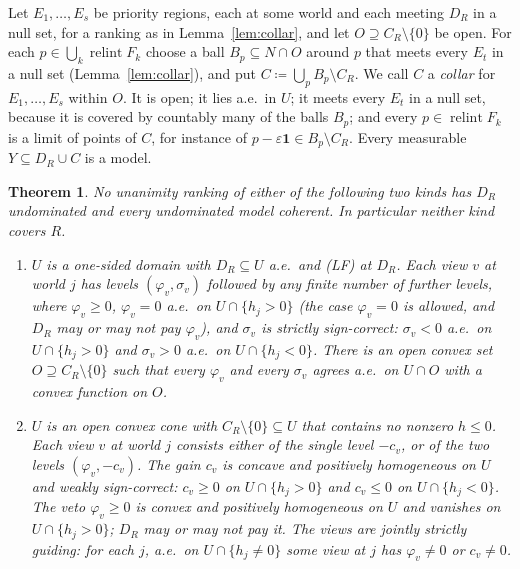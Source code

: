 \documentclass[11pt]{article}
\newcommand{\one}{\mathbf{1}}
\DeclareMathOperator{\relint}{relint}
\theoremstyle{plain}
\newtheorem{theorem}{Theorem}[section]
\theoremstyle{definition}
\theoremstyle{remark}
\begin{document}
Let $E_1,\dots,E_s$ be priority regions, each at some world and each meeting $D_R$ in a
null set, for a ranking as in Lemma~\ref{lem:collar}, and let $O\supseteq C_R\setminus
\{0\}$ be open. For each $p\in\bigcup_k\relint F_k$ choose a ball $B_p\subseteq N\cap O$
around $p$ that meets every $E_t$ in a null set (Lemma~\ref{lem:collar}), and put
$C\coloneqq\bigcup_pB_p\setminus C_R$. We call $C$ a \emph{collar} for $E_1,\dots,E_s$
within $O$. It is open; it lies a.e.\ in $U$; it meets every $E_t$ in a null set, because
it is covered by countably many of the balls $B_p$; and every $p\in\relint F_k$ is a limit
of points of $C$, for instance of $p-\varepsilon\one\in B_p\setminus C_R$. Every
measurable $Y\subseteq D_R\cup C$ is a model.

\begin{theorem}\label{thm:unan}
No unanimity ranking of either of the following two kinds has $D_R$ undominated and every
undominated model coherent. In particular neither kind covers $R$.
\begin{enumerate}[label=(\alph*)]
  \item $U$ is a one-sided domain with $D_R\subseteq U$ a.e.\ and (LF) at $D_R$. Each view
  $v$ at world $j$ has levels $(\varphi_v,\sigma_v)$ followed by any finite number of
  further levels, where $\varphi_v\ge0$, $\varphi_v=0$ a.e.\ on $U\cap\{h_j>0\}$ (the
  case $\varphi_v=0$ is allowed, and $D_R$ may or may not pay $\varphi_v$), and $\sigma_v$
  is strictly sign-correct: $\sigma_v<0$ a.e.\ on $U\cap\{h_j>0\}$ and $\sigma_v>0$ a.e.\
  on $U\cap\{h_j<0\}$. There is an open convex set $O\supseteq C_R\setminus\{0\}$ such
  that every $\varphi_v$ and every $\sigma_v$ agrees a.e.\ on $U\cap O$ with a convex
  function on $O$.
  \item $U$ is an open convex cone with $C_R\setminus\{0\}\subseteq U$ that contains no
  nonzero $h\le0$. Each view $v$ at world $j$ consists either of the single level $-c_v$,
  or of the two levels $(\varphi_v,-c_v)$. The gain $c_v$ is concave and positively
  homogeneous on $U$ and weakly sign-correct: $c_v\ge0$ on $U\cap\{h_j>0\}$ and $c_v\le0$
  on $U\cap\{h_j<0\}$. The veto $\varphi_v\ge0$ is convex and positively homogeneous on
  $U$ and vanishes on $U\cap\{h_j>0\}$; $D_R$ may or may not pay it. The views are
  \emph{jointly strictly guiding}: for each $j$, a.e.\ on $U\cap\{h_j\ne0\}$ some view at
  $j$ has $\varphi_v\ne0$ or $c_v\ne0$.
\end{enumerate}
\end{theorem}
\end{document}
